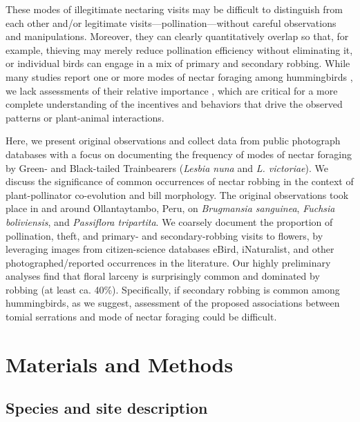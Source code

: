 \documentclass[fleqn,10pt,lineno]{wlpeerj}
\begin{document}
These modes of illegitimate nectaring visits may be difficult to distinguish from each other and/or legitimate visits---pollination---without careful observations and manipulations.
Moreover, they can clearly quantitatively overlap so that, for example, thieving may merely reduce pollination efficiency without eliminating it, or individual birds can engage in a mix of primary and secondary robbing.
While many studies report one or more modes of nectar foraging among hummingbirds \citep{mcdade1980,roubik1985,feinsinger1987,ornelas1994}, we lack assessments of their relative importance \citep{snow1980}, which are critical for a more complete understanding of the incentives and behaviors that drive the observed patterns or plant-animal interactions.

Here, we present original observations and collect data from public photograph databases with a focus on documenting the frequency of modes of nectar foraging by Green- and Black-tailed Trainbearers (\textit{Lesbia nuna} and \textit{L. victoriae}). We discuss the significance of common occurrences of nectar robbing in the context of plant-pollinator co-evolution and bill morphology. The original observations took place in and around Ollantaytambo, Peru, on \textit{Brugmansia sanguinea}, \textit{Fuchsia boliviensis}, and \textit{Passiflora tripartita}.  We coarsely document the proportion of pollination, theft, and primary- and secondary-robbing visits to flowers, by leveraging images from citizen-science databases eBird, iNaturalist, and other photographed/reported occurrences in the literature. Our highly preliminary analyses find that floral larceny is surprisingly common and dominated by robbing (at least ca. 40\%). Specifically, if secondary robbing is common among hummingbirds, as we suggest, assessment of the proposed associations between tomial serrations and mode of nectar foraging \citep{ornelas1994,rico-guevara2019} could be difficult.
\\

\section*{Materials and Methods}

\subsection*{Species and site description}
\end{document}
